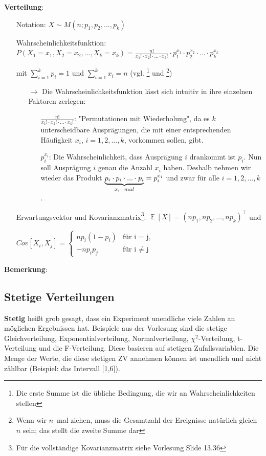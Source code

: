 \documentclass[a4paper]{article}
\DeclareMathOperator*{\E}{\mathbb{E}}
\begin{document}
\noindent \textbf{Verteilung}:
\begin{itemize}
\item[] Notation: $X \sim M(n;p_1,p_2,...,p_k)$
\item[] Wahrscheinlichkeitsfunktion: $P(X_1=x_1,X_2=x_2,...,X_k=x_k)=\frac{n!}{x_1! \cdot x_2! \cdot ... \cdot x_k!} \cdot p_1^{x_1} \cdot p_2^{x_2} \cdot ... \cdot p_k^{x_k}$
\item[] \hspace{4.5cm} mit $\sum_{i=1}^kp_i=1$ und $\sum_{i=1}^kx_i=n$ (vgl. \footnote{Die erste Summe ist die übliche Bedingung, die wir an Wahrscheinlichkeiten stellen} und \footnote{Wenn wir $n$--mal ziehen, muss die Gesamtzahl der Ereignisse natürlich gleich $n$ sein; das stellt die zweite Summe dar})
	\begin{itemize}
	\item[$\rightarrow$] Die Wahrscheinlichkeitsfunktion lässt sich intuitiv in ihre einzelnen Faktoren zerlegen:
		\begin{itemize}
		\item[] $\frac{n!}{x_1! \cdot x_2! \cdot ... \cdot x_k!}$:  "Permutationen mit Wiederholung", da es $k$ unterscheidbare Ausprägungen, die mit einer entsprechenden Häufigkeit $x_i$, $i=1,2,...,k$, vorkommen sollen, gibt.  
		\item[] $p_i^{x_i}$: Die Wahrscheinlichkeit, dass Ausprägung $i$ drankommt ist $p_i$. Nun soll Ausprägung $i$ genau die Anzahl $x_i$ haben. Deshalb nehmen wir wieder das Produkt  $\underbrace{p_i\cdot p_i \cdot ... \cdot p_i}_{x_i \hspace{0.2cm} mal} = p_i^{x_i}$ und zwar für alle $i=1,2,...,k$.
		\end{itemize}
	\end{itemize}
\item[] Erwartungsvektor und Kovarianzmatrix\footnote{Für die vollständige Kovarianzmatrix siehe Vorlesung Slide 13.36}: $\E[X]=(np_1,np_2,...,np_k)^{\top}$ und
\item[] \hspace{6.5cm} $Cov[X_i,X_j]=\begin{cases}
			np_i(1-p_i) & \text{für i = j,}\\
            -np_ip_j & \text{für i $\neq$ j}
		 \end{cases}$ 

\end{itemize}

\noindent \textbf{Bemerkung}: 


\subsection{Stetige Verteilungen} \label{sec:contdistr}
\textbf{Stetig} heißt grob gesagt, dass ein Experiment unendliche viele Zahlen an möglichen Ergebnissen hat. Beispiele aus der Vorlesung sind die stetige Gleichverteilung, Exponentialverteilung, Normalverteilung, $\chi^2$-Verteilung, t-Verteilung und die F-Verteilung. Diese basieren auf stetigen Zufallsvariablen. Die Menge der Werte, die diese stetigen ZV annehmen können ist unendlich und nicht zählbar (Beispiel: das Intervall [1,6]). 
\end{document}
